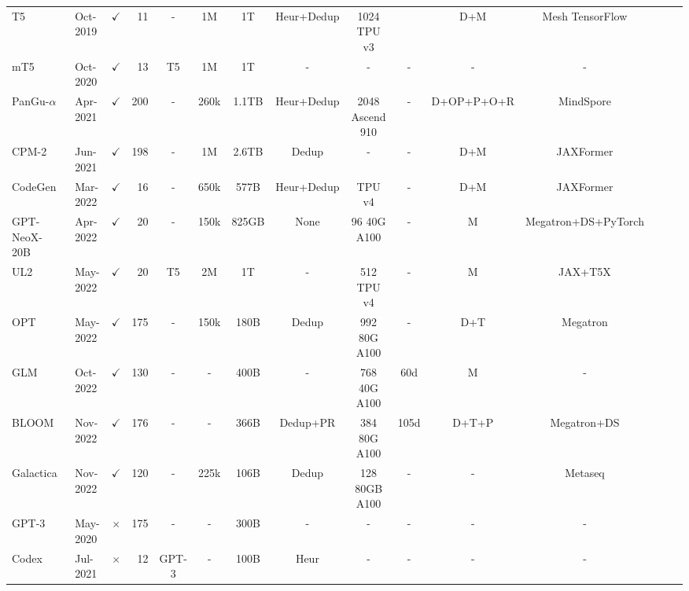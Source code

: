 \begin{table}[htbp]
\begin{center}
{\begin{tabular}{llcrccccccccccc}
\midrule
T5~\cite{T5}   & Oct-2019 &$\checkmark$ & 11   & -   & 1M & 1T & Heur+Dedup & 1024 TPU v3 &  & D+M & Mesh TensorFlow  \\

mT5~\cite{mT5}  & Oct-2020  &$\checkmark$  & 13    & T5  & 1M & 1T & - & -   & -  & - & - \\

{PanGu-$\alpha$}~\cite{PanGU_alpha}   & Apr-2021    &  $\checkmark$  & 200  &  -  &  260k  & 1.1TB  & Heur+Dedup &  2048 Ascend 910  & - & D+OP+P+O+R & MindSpore\\

CPM-2~\cite{CPM-2}    & Jun-2021  & $\checkmark$  & 198   & - & 1M & 2.6TB  & Dedup & - & - & D+M  & JAXFormer   \\

CodeGen~\cite{CodeGen}  & Mar-2022    &  $\checkmark$  & 16   & -  & 650k & 577B  & Heur+Dedup   & TPU v4 & - & D+M & JAXFormer  \\

GPT-NeoX-20B~\cite{black2022gpt} & Apr-2022    & $\checkmark$    & 20   & - & 150k & 825GB & None & 96 40G A100 & - & M & Megatron+DS+PyTorch     \\

UL2~\cite{UL2}  & May-2022    &  $\checkmark$   & 20   & T5  & 2M & 1T & - & 512 TPU v4  & -  & M & JAX+T5X    \\

OPT~\cite{OPT}  & May-2022    & $\checkmark$   & 175   & - &  150k  & 180B  &  Dedup   & 992 80G A100  & -  & D+T & Megatron   \\

GLM~\cite{GLM-130B}  & Oct-2022 & $\checkmark$   & 130   & - & - & 400B   & -  & 768 40G A100    & 60d  & M & -    \\

BLOOM~\cite{BLOOM}    & Nov-2022  & $\checkmark$  & 176   & -   & - & 366B & Dedup+PR  & 384 80G A100    & 105d  &  D+T+P  & Megatron+DS    \\

Galactica~\cite{galactica} & Nov-2022    & $\checkmark$ & 120   & - & 225k & 106B & Dedup  &  128 80GB A100   & -  & - & Metaseq    \\

GPT-3~\cite{GPT-3}    & May-2020   & $\times$ & 175   & - & - & 300B & -  & -   & -  & - & -       \\

Codex~\cite{codex}    & Jul-2021 & $\times$   & 12    & GPT-3 & - & 100B & Heur & -   & -  & -    & - \\


\end{tabular}}
\end{center}
\end{table}

